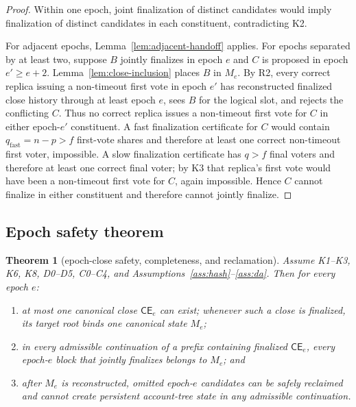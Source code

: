\documentclass[11pt]{article}
\newtheorem{theorem}{Theorem}
\theoremstyle{definition}
\theoremstyle{remark}
\newcommand{\CE}{\mathsf{CE}}
\begin{document}
\begin{proof}
Within one epoch, joint finalization of distinct candidates would imply finalization of distinct candidates in each constituent, contradicting K2.

For adjacent epochs, Lemma~\ref{lem:adjacent-handoff} applies. For epochs separated by at least two, suppose $B$ jointly finalizes in epoch $e$ and $C$ is proposed in epoch $e'\ge e+2$. Lemma~\ref{lem:close-inclusion} places $B$ in $M_e$. By R2, every correct replica issuing a non-timeout first vote in epoch $e'$ has reconstructed finalized close history through at least epoch $e$, sees $B$ for the logical slot, and rejects the conflicting $C$. Thus no correct replica issues a non-timeout first vote for $C$ in either epoch-$e'$ constituent. A fast finalization certificate for $C$ would contain $q_{\mathrm{fast}}=n-p>f$ first-vote shares and therefore at least one correct non-timeout first voter, impossible. A slow finalization certificate has $q>f$ final voters and therefore at least one correct final voter; by K3 that replica's first vote would have been a non-timeout first vote for $C$, again impossible. Hence $C$ cannot finalize in either constituent and therefore cannot jointly finalize.
\end{proof}

\subsection{Epoch safety theorem}

\begin{theorem}[epoch-close safety, completeness, and reclamation]
\label{thm:epoch-safety}
Assume K1--K3, K6, K8, D0--D5, C0--C4, and Assumptions~\ref{ass:hash}--\ref{ass:da}. Then for every epoch $e$:
\begin{enumerate}[label=(\roman*)]
  \item at most one canonical close $\CE_e$ can exist; whenever such a close is finalized, its target root binds one canonical state $M_e$;
  \item in every admissible continuation of a prefix containing finalized $\CE_e$, every epoch-$e$ block that jointly finalizes belongs to $M_e$; and
  \item after $M_e$ is reconstructed, omitted epoch-$e$ candidates can be safely reclaimed and cannot create persistent account-tree state in any admissible continuation.
\end{enumerate}
\end{theorem}
\end{document}
